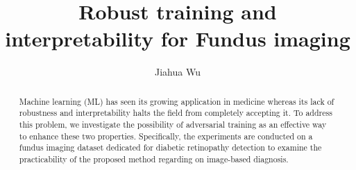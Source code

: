 \documentclass{article}
\title{Robust training and interpretability for Fundus imaging}
\author{
Jiahua Wu
}
\begin{document}
\maketitle

\begin{abstract}
Machine learning (ML) has seen its growing application in medicine whereas its lack of robustness and interpretability halts the field from completely accepting it. To address this problem, we investigate the possibility of adversarial training as an effective way to enhance these two properties. Specifically, the experiments are conducted on a fundus imaging dataset dedicated for diabetic retinopathy detection to examine the practicability of the proposed method regarding on image-based diagnosis. 
\end{abstract}





\newpage

\newpage

\newpage
\printbibliography
\printglossaries
\end{document}
